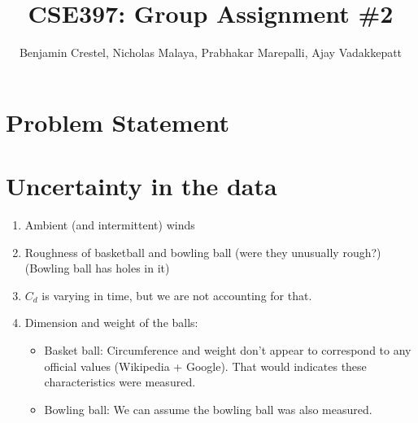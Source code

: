 \documentclass{article}
\title{\bf{CSE397: Group Assignment \#2}}
\author{Benjamin Crestel, Nicholas Malaya, Prabhakar Marepalli, Ajay Vadakkepatt}
\date{}
\begin{document}
\maketitle

\newpage
\section*{Problem Statement}

\section{Uncertainty in the data}
\begin{enumerate}
 \item Ambient (and intermittent) winds
 \item Roughness of basketball and bowling ball (were they unusually
       rough?) (Bowling ball has holes in it)
 \item $C_d$ is varying in time, but we are not accounting for that.
 \item Dimension and weight of the balls:
\begin{itemize}
 \item Basket ball: Circumference and weight don't appear to correspond
       to any official values (Wikipedia + Google). That would indicates
       these characteristics were measured. 
 \item Bowling ball: We can assume the bowling ball was also measured.
\end{itemize}


\end{enumerate}
\end{document}
